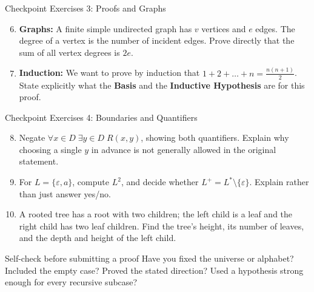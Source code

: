 \documentclass[10pt]{beamer}
\begin{document}
\begin{frame}{Checkpoint Exercises 3: Proofs and Graphs}
  \small
  \begin{enumerate}
      \setcounter{enumi}{5}
      \item \textbf{Graphs:} A finite simple undirected graph has $v$ vertices
        and $e$ edges. The degree of a vertex is the number of incident
        edges. Prove directly that the sum of all vertex degrees is $2e$.
      \vspace{0.5cm}
      \item \textbf{Induction:} We want to prove by induction that $1 + 2 + \dots + n = \frac{n(n+1)}{2}$. 
      \newline State explicitly what the \textbf{Basis} and the \textbf{Inductive Hypothesis} are for this proof.
  \end{enumerate}
\end{frame}

\begin{frame}{Checkpoint Exercises 4: Boundaries and Quantifiers}
  \small
  \begin{enumerate}
    \setcounter{enumi}{7}
    \item Negate $\forall x\in D\;\exists y\in D\;R(x,y)$, showing both
      quantifiers. Explain why choosing a single $y$ in advance is not
      generally allowed in the original statement.
    \pause
    \item For $L=\{\varepsilon,a\}$, compute $L^2$, and decide whether
      $L^+=L^*\setminus\{\varepsilon\}$. Explain rather than just answer yes/no.
    \pause
    \item A rooted tree has a root with two children; the left child is a
      leaf and the right child has two leaf children. Find the tree's height,
      its number of leaves, and the depth and height of the left child.
  \end{enumerate}
  \begin{block}{Self-check before submitting a proof}
    Have you fixed the universe or alphabet? Included the empty case?
    Proved the stated direction? Used a hypothesis strong enough for
    every recursive subcase?
  \end{block}
\end{frame}
\end{document}
